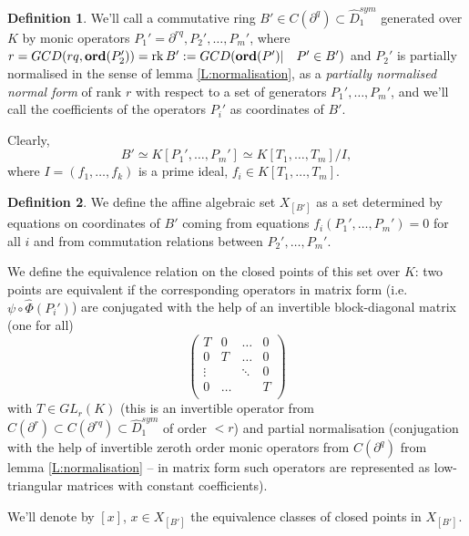 \documentclass[11pt]{article}
\theoremstyle{definition}
\newcommand{\rk}{\mathop {\rm rk}}
\newtheorem{Def}{Definition}[section]
\theoremstyle{plain}
\numberwithin{equation}{section}
\newcommand{\Ord}{\mathop {\rm \bf ord}}
\begin{document}
\begin{Def}
\label{D:normalised_normal_form}
We'll call a commutative ring $B'\in C(\partial^q)\subset \hat{D}_1^{sym}$ generated over $K$ by monic operators $P_1'=\partial^{rq}, P_2', \ldots, P_m'$, where $r=GCD(rq, \Ord (P_2'))=\rk B':=GCD(\Ord (P')|\quad P'\in B')$ and $P_2'$ is partially normalised in the sense of lemma \ref{L:normalisation}, as a {\it partially normalised normal form} of rank $r$ with respect to a  set of generators $P_1',\ldots , P_m'$, and we'll call the coefficients of the operators $P_i'$ as coordinates of $B'$. 
\end{Def}

Clearly, 
$$
B'\simeq K[P_1',\ldots ,P_m']\simeq K[T_1,\ldots ,T_m]/I,
$$
where $I=(f_1,\ldots ,f_k)$ is a prime ideal, $f_i\in K[T_1,\ldots ,T_m]$. 

\begin{Def}
\label{D:X_B}
We define the affine algebraic set $X_{[B']}$ as a set determined by equations on coordinates of $B'$ coming from equations $f_i(P_1', \ldots , P_m')=0$ for all $i$ and from commutation relations between $P_2', \ldots , P_m'$. 

We define the equivalence relation on the closed points of this set over $K$: two points are equivalent if the corresponding operators in matrix form (i.e. $\psi\circ \hat{\Phi} (P_i')$)  
are conjugated with the help of an invertible block-diagonal matrix (one for all)
$$
\left (
\begin{array}{cccc}
T&0&\ldots &0\\
0&T&\ldots &0\\
\vdots&&\ddots&0\\
0&\ldots &&T\\
\end{array}
\right )
$$
 with  $T\in GL_r(K)$ (this is an  
invertible operator from $C(\partial^r)\subset C(\partial^{rq})\subset \hat{D}_1^{sym}$ of order $<r$) and partial normalisation (conjugation with the help of invertible zeroth order monic operators from $C(\partial^q)$ from lemma \ref{L:normalisation} -- in matrix form such operators are represented as low-triangular matrices with constant coefficients). 

We'll denote by $[x]$, $x\in X_{[B']}$ the equivalence classes of closed points in $X_{[B']}$. 
\end{Def}
\end{document}
